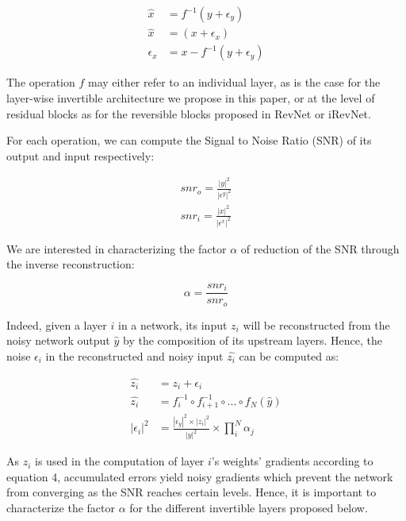 \documentclass[twocolumn]{bmcart}
\begin{document}
 \begin{subequations}
   \begin{align}
   \hat{x} &= f^{-1}(y+\epsilon_y) \\
   \hat{x} &= (x+\epsilon_x) \\
   \epsilon_x &= x - f^{-1}(y+\epsilon_y)
   \end{align}
 \end{subequations}

The operation $f$ may either refer to an individual layer,
as is the case for the layer-wise invertible architecture we propose in this paper,
or at the level of residual blocks as for the reversible blocks proposed in RevNet or iRevNet.

For each operation, we can compute the Signal to Noise Ratio (SNR) of its output and input respectively:

\begin{subequations}
\begin{align}
snr_o = \frac{|y|^2}{|\epsilon^y|^2} \\
snr_i = \frac{|x|^2}{|\epsilon^x|^2}
\end{align}
\end{subequations}

We are interested in characterizing the factor $\alpha$ of reduction of the SNR through the inverse reconstruction:

\begin{equation}
\alpha = \frac{snr_i}{snr_o}
\end{equation}

Indeed, given a layer $i$ in a network, its input $z_i$ will be reconstructed
from the noisy network output $\hat{y}$ by the composition of its upstream layers.
Hence, the noise $\epsilon_i$ in the reconstructed and noisy input $\hat{z_i}$ can be computed as:

\begin{subequations}
\begin{align}
\hat{z_i}  &= z_i + \epsilon_i \\
\hat{z_i}  &=  f_i^{-1} \circ f_{i+1}^{-1} \circ ... \circ f_N(\hat{y})\\
| \epsilon_i |^2 &=  \frac{| \epsilon_y |^2 \times | z_i |^2}{| y |^2} \times \prod_i^{N} \alpha_j
\end{align}
\end{subequations}

As $z_i$ is used in the computation of layer $i$'s weights' gradients according to equation 4,
accumulated errors yield noisy gradients which prevent the network from converging as the SNR reaches certain levels.
Hence, it is important to characterize the factor $\alpha$ for the different invertible layers proposed below.
\end{document}
